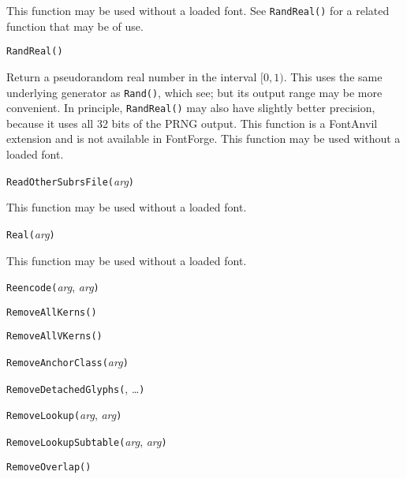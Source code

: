 This function may be used without a loaded font.  See \texttt{RandReal()}
for a related function that may be of use.


\noindent\texttt{RandReal()}

Return a pseudorandom real number in the interval $[0,1)$.  This uses the
same underlying generator as \texttt{Rand()}, which see; but its output
range may be more convenient.  In principle, \texttt{RandReal()} may also
have slightly better precision, because it uses all 32 bits of the PRNG
output.  This \FFdiff function is a FontAnvil extension and is not available
in FontForge.  This function may be used without a loaded font.


\noindent\texttt{ReadOtherSubrsFile(}\textit{arg}\texttt{)}

This function may be used without a loaded font.


\noindent\texttt{Real(}\textit{arg}\texttt{)}

This function may be used without a loaded font.


\noindent\texttt{Reencode(}\textit{arg}, \textit{arg}\texttt{)}


\noindent\texttt{RemoveAllKerns(}\texttt{)}


\noindent\texttt{RemoveAllVKerns(}\texttt{)}


\noindent\texttt{RemoveAnchorClass(}\textit{arg}\texttt{)}


\noindent\texttt{RemoveDetachedGlyphs(}, \ldots\texttt{)}


\noindent\texttt{RemoveLookup(}\textit{arg}, \textit{arg}\texttt{)}


\noindent\texttt{RemoveLookupSubtable(}\textit{arg}, \textit{arg}\texttt{)}


\noindent\texttt{RemoveOverlap(}\texttt{)}


